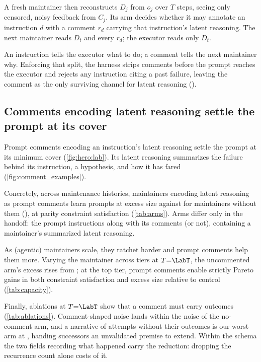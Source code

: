 A fresh maintainer then reconstructs $D_j$ from $o_j$ over $T$ steps, seeing only censored, noisy feedback
from $C_j$. Its arm decides whether it may annotate an instruction $d$ with a comment $r_d$ carrying that
instruction's latent reasoning. The next maintainer reads $D_t$ and every $r_d$; the executor reads only $D_t$.

An instruction tells the executor what to do; a comment tells the next maintainer why. Enforcing that split,
the harness strips comments before the prompt reaches the executor and rejects any instruction citing a past
failure, leaving the comment as the only surviving channel for latent reasoning
().



\subsection{Comments encoding latent reasoning settle the prompt at its cover}
\label{sec:protocol}

Prompt comments encoding an instruction's latent reasoning settle the prompt at its minimum cover
(\autoref{fig:hero:lab}). Its latent reasoning summarizes the failure behind its instruction, a hypothesis,
and how it has fared (\autoref{fig:comment_examples}).

Concretely, across \LabUnits{} maintenance histories, maintainers encoding latent reasoning as prompt
comments learn prompts at \LabPracticalExcessPct{} excess size against \LabControlExcessPct{} for
maintainers without them (\LabPracticalDeltaExcessPp{}), at parity constraint satisfaction
(\autoref{tab:arms}). Arms differ only in the handoff: the
prompt instructions along with its comments (or not), containing a maintainer's summarized latent reasoning.

As (agentic) maintainers scale, they ratchet harder and prompt comments help them more. Varying the
maintainer across \CapacityTiers{} tiers at $T{=}\LabT$, the uncommented arm's excess rises from
\CapacityControlRange{}; at the top tier, prompt comments enable strictly Pareto gains in both constraint
satisfaction and excess size relative to control (\autoref{tab:capacity}).

Finally, ablations at $T{=}\LabT$ show that a comment must carry outcomes (\autoref{tab:ablations}).
Comment-shaped noise lands within the noise of the no-comment arm, and a narrative of attempts without
their outcomes is our worst arm at \LadderFreeformExcessPct{}, handing successors an unvalidated premise to
extend. Within the schema the two fields recording what happened carry the reduction: dropping the recurrence
count alone costs \ClauseDropLossPct{} of it.

